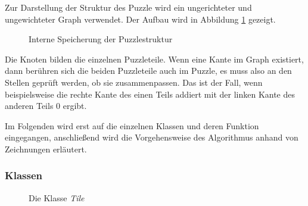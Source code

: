 \documentclass[a4paper, 12pt]{scrartcl}
\begin{document}
Zur Darstellung der Struktur des Puzzle wird ein ungerichteter und ungewichteter Graph verwendet. Der Aufbau wird in Abbildung \ref{Graph1} gezeigt.

\begin{figure}[h]
    \centering
    \caption{Interne Speicherung der Puzzlestruktur}
    \label{Graph1}
\end{figure}

Die Knoten bilden die einzelnen Puzzleteile. Wenn eine Kante im Graph existiert, dann berühren sich die beiden Puzzleteile auch im Puzzle, es muss also an den Stellen geprüft werden, ob sie zusammenpassen. Das ist der Fall, wenn beispielsweise die rechte Kante des einen Teils addiert mit der linken Kante des anderen Teils 0 ergibt.

Im Folgenden wird erst auf die einzelnen Klassen und deren Funktion eingegangen, anschließend wird die Vorgehensweise des Algorithmus anhand von Zeichnungen erläutert.

\subsubsection{Klassen}
\begin{figure}[h]
    \centering
    \caption{Die Klasse \emph{Tile}}
    \label{tile}
\end{figure}
\end{document}
